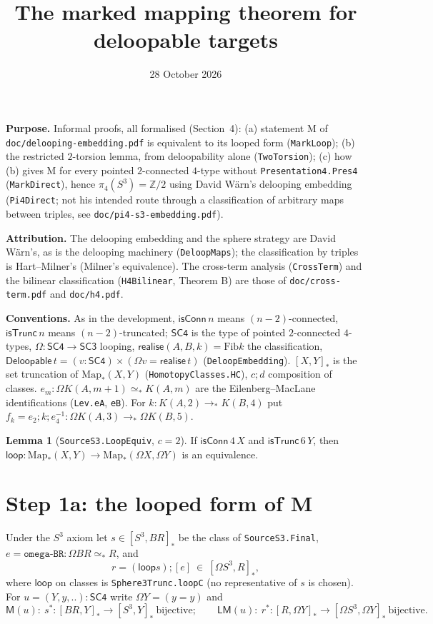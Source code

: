 \documentclass[11pt]{amsart}
\title{The marked mapping theorem for deloopable targets}
\date{28 October 2026}
\theoremstyle{definition}
\theoremstyle{remark}
\newcommand{\Om}{\Omega}
\newcommand{\code}[1]{\texttt{#1}}
\newcommand{\cT}{\mathsf{isTrunc}}
\newcommand{\cC}{\mathsf{isConn}}
\newcommand{\Fib}{\mathrm{Fib}}
\newcommand{\SCt}{\mathsf{SC3}}
\newcommand{\SCf}{\mathsf{SC4}}
\newcommand{\Del}{\mathsf{Deloopable}}
\newcommand{\real}{\mathsf{realise}}
\newcommand{\pteq}{\simeq_*}
\newcommand{\Map}{\mathrm{Map}_*}
\newcommand{\lp}{\mathsf{loop}}
\newcommand{\Z}{\mathbb{Z}}
\newcommand{\cls}[1]{[#1]}
\begin{document}
\maketitle
\sloppy

\noindent\textbf{Purpose.} Informal proofs, all formalised (Section~4): (a)
statement M of \code{doc/delooping-embedding.pdf} is equivalent to its looped
form (\code{MarkLoop}); (b) the restricted $2$-torsion lemma, from
deloopability alone (\code{TwoTorsion}); (c) how (b) gives M for every pointed
$2$-connected $4$-type without \code{Presentation4.Pres4} (\code{MarkDirect}),
hence $\pi_4(S^3)=\Z/2$ using David Wärn's delooping embedding (\code{Pi4Direct}; not his intended route through a classification of arbitrary maps between triples, see \code{doc/pi4-s3-embedding.pdf}).

\noindent\textbf{Attribution.} The delooping embedding and the sphere strategy
are David Wärn's, as is the delooping machinery (\code{DeloopMaps}); the
classification by triples is Hart--Milner's (Milner's equivalence). The
cross-term analysis (\code{CrossTerm}) and the bilinear classification
(\code{H4Bilinear}, Theorem B) are those of \code{doc/cross-term.pdf} and
\code{doc/h4.pdf}.

\noindent\textbf{Conventions.} As in the development, $\cC\,n$ means
$(n-2)$-connected, $\cT\,n$ means $(n-2)$-truncated; $\SCf$ is the type of
pointed $2$-connected $4$-types, $\Om:\SCf\to\SCt$ looping, $\real(A,B,k)=\Fib k$
the classification, $\Del\,t=(v:\SCf)\times(\Om v=\real\,t)$
(\code{DeloopEmbedding}). $[X,Y]_*$ is the set truncation of $\Map(X,Y)$
(\code{HomotopyClasses.HC}), $c;d$ composition of classes. $e_m:\Om K(A,m+1)\pteq
K(A,m)$ are the Eilenberg--MacLane identifications (\code{Lev.eA}, \code{eB}).
For $k:K(A,2)\to_*K(B,4)$ put $f_k=e_2;k;e_4^{-1}:\Om K(A,3)\to_*\Om K(B,5)$.

\noindent\textbf{Lemma 1} (\code{SourceS3.LoopEquiv}, $c=2$). If $\cC\,4\,X$ and
$\cT\,6\,Y$, then $\lp:\Map(X,Y)\to\Map(\Om X,\Om Y)$ is an equivalence.

\section{Step 1a: the looped form of M}

Under the $S^3$ axiom let $s\in[S^3,BR]_*$ be the class of
\code{SourceS3.Final}, $e=\code{omega-BR}:\Om BR\pteq R$, and
\[
  r=(\lp s);\cls e\ \in\ [\Om S^3,R]_*,
\]
where $\lp$ on classes is \code{Sphere3Trunc.loopC} (no representative of $s$ is
chosen). For $u=(Y,y,..):\SCf$ write $\Om Y=(y=y)$ and
\[
  \mathsf{M}(u):\ s^*:[BR,Y]_*\to[S^3,Y]_*\ \text{bijective};\qquad
  \mathsf{LM}(u):\ r^*:[R,\Om Y]_*\to[\Om S^3,\Om Y]_*\ \text{bijective}.
\]
\end{document}
